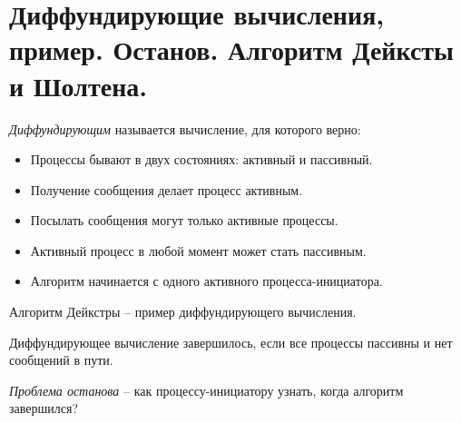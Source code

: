 \section{Диффундирующие вычисления, пример. Останов. Алгоритм Дейксты и Шолтена.}

\begin{definition}
    \textit{Диффундирующим} называется вычисление, для которого верно:
    \begin{itemize}
        \item Процессы бывают в двух состояниях: активный и пассивный.
        \item Получение сообщения делает процесс активным.
        \item Посылать сообщения могут только активные процессы.
        \item Активный процесс в любой момент может стать пассивным.
        \item Алгоритм начинается с одного активного процесса-инициатора.
    \end{itemize}
\end{definition}

\begin{example}
    Алгоритм Дейкстры -- пример диффундирующего вычисления.
\end{example}

\begin{definition}
    Диффундирующее вычисление завершилось, если все процессы пассивны и нет
    сообщений в пути.
\end{definition}

\begin{definition}
    \textit{Проблема останова} -- как процессу-инициатору узнать, когда
    алгоритм завершился?
\end{definition}

